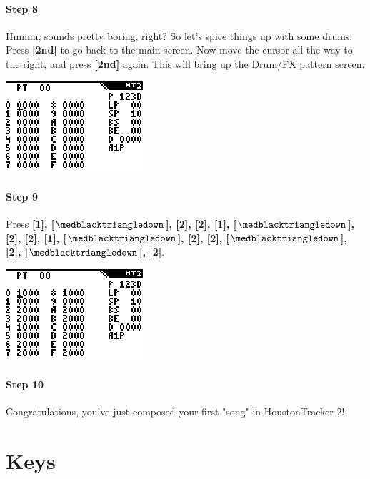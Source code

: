 \documentclass[12pt]{report}	%
\begin{document}
\paragraph{Step 8} Hmmm, sounds pretty boring, right? So let's spice things up with some drums. Press \textbf{[2nd]} to go back to the main screen. Now move the cursor all the way to the right, and press \textbf{[2nd]} again. This will bring up the Drum/FX pattern screen. \newline

{\includegraphics{tut4}} \newline

\paragraph{Step 9} Press \textbf{[1], [\(\medblacktriangledown\)], [2], [2], [1], [\(\medblacktriangledown\)], [2], [2], [1], [\(\medblacktriangledown\)], [2], [2], [\(\medblacktriangledown\)], [2], [\(\medblacktriangledown\)], [2]}. \newline

{\includegraphics{tut5}} \newline

\paragraph{Step 10} Congratulations, you've just composed your first "song" in HoustonTracker 2!


\section{Keys}
\label{sec:keys}
\end{document}
